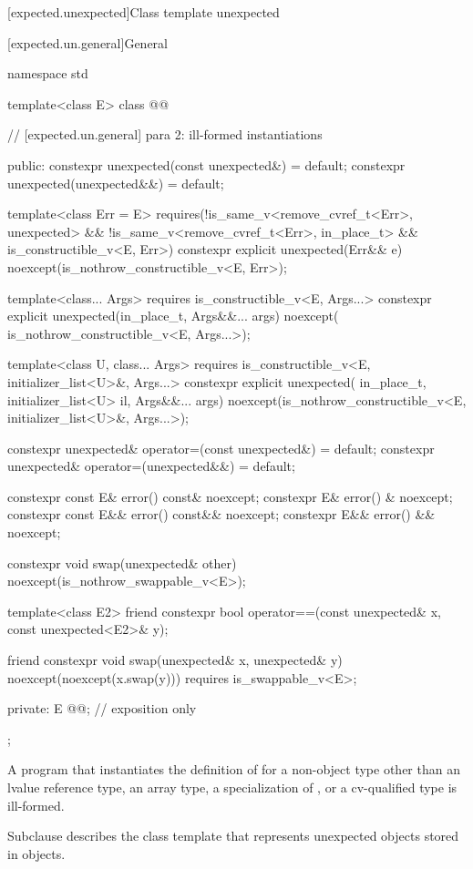 [expected.unexpected]{Class template unexpected}

[expected.un.general]{General}

\begin{codeblock}
namespace std {
  template<class E>
  class @@ {
    // [expected.un.general] para 2: ill-formed instantiations

  public:
    constexpr unexpected(const unexpected&) = default;
    constexpr unexpected(unexpected&&) = default;

    template<class Err = E>
      requires(!is_same_v<remove_cvref_t<Err>, unexpected> &&
               !is_same_v<remove_cvref_t<Err>, in_place_t> && is_constructible_v<E, Err>)
    constexpr explicit unexpected(Err&& e) noexcept(is_nothrow_constructible_v<E, Err>);

    template<class... Args>
      requires is_constructible_v<E, Args...>
    constexpr explicit unexpected(in_place_t, Args&&... args) noexcept(
        is_nothrow_constructible_v<E, Args...>);

    template<class U, class... Args>
      requires is_constructible_v<E, initializer_list<U>&, Args...>
    constexpr explicit unexpected(
        in_place_t, initializer_list<U> il,
        Args&&... args) noexcept(is_nothrow_constructible_v<E, initializer_list<U>&,
                                                            Args...>);

    constexpr unexpected& operator=(const unexpected&) = default;
    constexpr unexpected& operator=(unexpected&&) = default;

    constexpr const E& error() const& noexcept;
    constexpr E& error() & noexcept;
    constexpr const E&& error() const&& noexcept;
    constexpr E&& error() && noexcept;

    constexpr void swap(unexpected& other) noexcept(is_nothrow_swappable_v<E>);

    template<class E2>
    friend constexpr bool operator==(const unexpected& x, const unexpected<E2>& y);

    friend constexpr void swap(unexpected& x, unexpected& y) noexcept(noexcept(x.swap(y)))
      requires is_swappable_v<E>;

  private:
    E @@; // exposition only
  };
}
\end{codeblock}

\begin{itemdescr}
\pnum
\mandates
A program that instantiates the definition of  for a non-object type other than an lvalue reference type, an array type, a specialization of , or a cv-qualified type is ill-formed.

\pnum
\remarks
Subclause  describes the class template  that represents unexpected objects stored in  objects.
\end{itemdescr}

